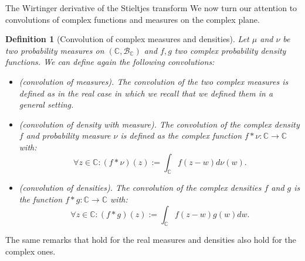 \documentclass[11pt, a4paper, oneside]{book}
\numberwithin{equation}{chapter}
\newtheorem{definition}{Definition}[section]
\begin{document}
\begin{section}{The Wirtinger derivative of the Stieltjes transform}
We now turn our attention to convolutions of complex functions and measures on the complex plane.
%
\begin{definition}[Convolution of complex measures and densities] Let $\mu$ and $\nu$ be two probability measures on $(\mathbb{C},\mathcal{B}_{\mathbb{C}})$ and $f,g$ two complex probability density functions. We can define again the following convolutions:
%
\begin{itemize}
    \item (\textit{convolution of measures}). The convolution of the two complex measures is defined as in the real case in which we recall that we defined them in a general setting.
    \item (\textit{convolution of density with measure}). The convolution of the complex density $f$ and probability measure $\nu$ is defined as the complex function $f \ast \nu: \mathbb{C} \to \mathbb{C}$ with:
    \[
    \forall z \in \mathbb{C}: (f \ast \nu)(z) := \int_{\mathbb{C}} f(z-w)d\nu(w).
    \]
    \item (\textit{convolution of densities).} The convolution of the complex densities $f$ and $g$ is the function $f \ast g: \mathbb{C} \to \mathbb{C}$ with:
    \[
    \forall z \in \mathbb{C}: ( f \ast g )(z) := \int_{\mathbb{C}} f(z-w) g(w)dw.
    \]
\end{itemize}
\end{definition}
%
The same remarks that hold for the real measures and densities also hold for the complex ones.


\end{section}
\end{document}
